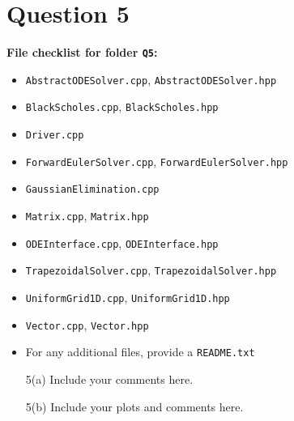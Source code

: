 \documentclass[a4,10pt,fleqn]{article}  %
\newcommand{\il}[1]{\texttt{#1}}
\begin{document}
\clearpage

\section*{Question 5}

\textbf{File checklist for folder \il{Q5}:}
\begin{itemize}
  \item \il{AbstractODESolver.cpp}, \il{AbstractODESolver.hpp}
  \item \il{BlackScholes.cpp}, \il{BlackScholes.hpp}
  \item \il{Driver.cpp}
  \item \il{ForwardEulerSolver.cpp}, \il{ForwardEulerSolver.hpp}
  \item \il{GaussianElimination.cpp}
  \item \il{Matrix.cpp}, \il{Matrix.hpp}
  \item \il{ODEInterface.cpp}, \il{ODEInterface.hpp}
  \item \il{TrapezoidalSolver.cpp}, \il{TrapezoidalSolver.hpp}
  \item \il{UniformGrid1D.cpp}, \il{UniformGrid1D.hpp}
  \item \il{Vector.cpp}, \il{Vector.hpp}
  \item For any additional files, provide a \il{README.txt}
\end{itemize}

\vspace{10mm}
\begin{itemize}

\item[5(a)] Include your comments here.

\item[5(b)] Include your plots and comments here.

\end{itemize}
\end{document}
